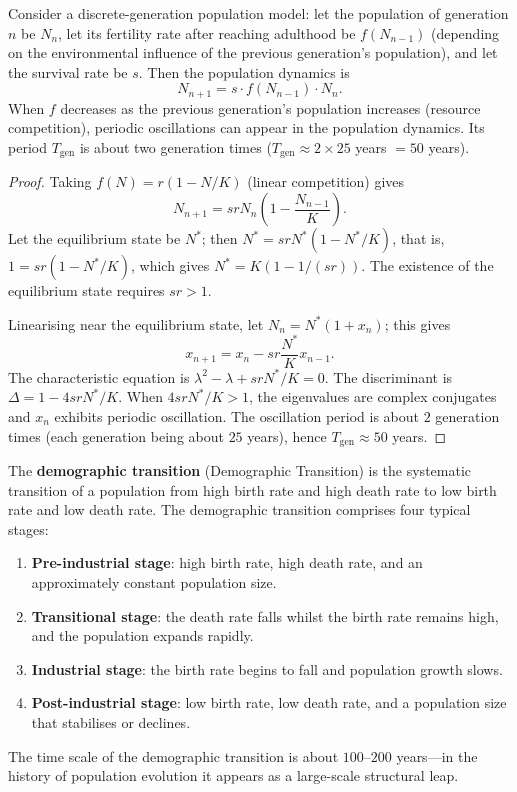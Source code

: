 \begin{proposition}\label{prop:generational_population_cycle}
Consider a discrete-generation population model: let the population of generation $n$ be $N_n$, let its fertility rate after reaching adulthood be $f(N_{n-1})$ (depending on the environmental influence of the previous generation's population), and let the survival rate be $s$. Then the population dynamics is
\[
N_{n+1} = s \cdot f(N_{n-1}) \cdot N_n.
\]
When $f$ decreases as the previous generation's population increases (resource competition), periodic oscillations can appear in the population dynamics. Its period $T_{\text{gen}}$ is about two generation times ($T_{\text{gen}} \approx 2 \times 25$ years $= 50$ years).
\end{proposition}

\begin{proof}
Taking $f(N) = r(1 - N/K)$ (linear competition) gives
\[
N_{n+1} = s r N_n \left(1 - \frac{N_{n-1}}{K}\right).
\]
Let the equilibrium state be $N^*$; then $N^* = s r N^*(1 - N^*/K)$, that is, $1 = s r (1 - N^*/K)$, which gives $N^* = K(1 - 1/(sr))$. The existence of the equilibrium state requires $sr > 1$.

Linearising near the equilibrium state, let $N_n = N^*(1 + x_n)$; this gives
\[
x_{n+1} = x_n - s r \frac{N^*}{K} x_{n-1}.
\]
The characteristic equation is $\lambda^2 - \lambda + s r N^*/K = 0$. The discriminant is $\Delta = 1 - 4 s r N^*/K$. When $4 s r N^*/K > 1$, the eigenvalues are complex conjugates and $x_n$ exhibits periodic oscillation. The oscillation period is about $2$ generation times (each generation being about $25$ years), hence $T_{\text{gen}} \approx 50$ years.
\end{proof}

\begin{definition}\label{def:demographic_transition}
The \textbf{demographic transition} (Demographic Transition) is the systematic transition of a population from high birth rate and high death rate to low birth rate and low death rate. The demographic transition comprises four typical stages:
\begin{enumerate}[label=(\roman*)]
    \item \textbf{Pre-industrial stage}: high birth rate, high death rate, and an approximately constant population size.
    \item \textbf{Transitional stage}: the death rate falls whilst the birth rate remains high, and the population expands rapidly.
    \item \textbf{Industrial stage}: the birth rate begins to fall and population growth slows.
    \item \textbf{Post-industrial stage}: low birth rate, low death rate, and a population size that stabilises or declines.
\end{enumerate}
The time scale of the demographic transition is about $100$--$200$ years---in the history of population evolution it appears as a large-scale structural leap.
\end{definition}

